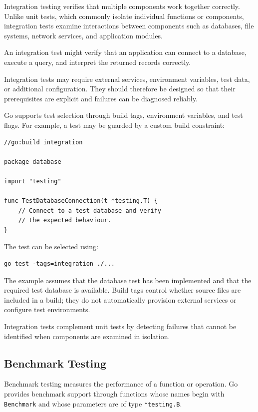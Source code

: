 Integration testing verifies that multiple components work together correctly. Unlike unit tests, which commonly isolate individual functions or components, integration tests examine interactions between components such as databases, file systems, network services, and application modules.

An integration test might verify that an application can connect to a database, execute a query, and interpret the returned records correctly.

Integration tests may require external services, environment variables, test data, or additional configuration. They should therefore be designed so that their prerequisites are explicit and failures can be diagnosed reliably.

Go supports test selection through build tags, environment variables, and test flags. For example, a test may be guarded by a custom build constraint:

\begin{lstlisting}
//go:build integration

package database

import "testing"

func TestDatabaseConnection(t *testing.T) {
    // Connect to a test database and verify
    // the expected behaviour.
}
\end{lstlisting}

The test can be selected using:

\begin{lstlisting}
go test -tags=integration ./...
\end{lstlisting}

The example assumes that the database test has been implemented and that the required test database is available. Build tags control whether source files are included in a build; they do not automatically provision external services or configure test environments.

Integration tests complement unit tests by detecting failures that cannot be identified when components are examined in isolation.

\subsection{Benchmark Testing}

Benchmark testing measures the performance of a function or operation. Go provides benchmark support through functions whose names begin with \texttt{Benchmark} and whose parameters are of type \texttt{*testing.B}.


